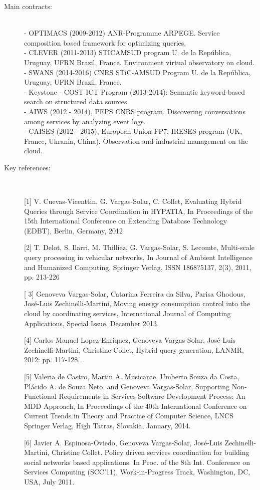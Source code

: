 \begin{description}

\item[Main contracts:] \ \\
- OPTIMACS (2009-2012)	ANR-Programme ARPEGE. Service composition based framework for optimizing queries. \\
- CLEVER (2011-2013) STICAMSUD program  U. de la Rep{\'u}blica, Uruguay, UFRN Brazil, France. Environment virtual observatory on cloud. \\
- SWANS (2014-2016) CNRS STiC-AMSUD Program U. de la Rep{\'u}blica, Uruguay, UFRN Brazil,  France. \\
- Keystone - COST ICT Program (2013-2014): Semantic keyword-based search on structured data sources. \\
- AIWS (2012 - 2014), PEPS  CNRS program. Discovering conversations among services by analyzing event logs.\\
- CAISES (2012 - 2015), European Union FP7, IRESES program (UK, France, Ukrania, China). Observation and industrial management on the cloud.  

\item[Key references:]~%

[1] V. Cuevas-Vicenttin, G.  Vargas-Solar, C. Collet, Evaluating Hybrid Queries through Service Coordination in HYPATIA, In Proceedings of the 15th International Conference on Extending Database Technology (EDBT), Berlin, Germany, 2012

[2] T. Delot, S. Ilarri, M. Thilliez, G.  Vargas-Solar, S. Lecomte, Multi-scale query processing in vehicular networks, In Journal of Ambient Intelligence and Humanized Computing, Springer Verlag, ISSN 1868?5137, 2(3), 2011, pp. 213-226

[ 3]	Genoveva Vargas-Solar, Catarina Ferreira da Silva, Parisa Ghodous, Jos{\'e}-Luis Zechinelli-Martini, Moving energy consumption control into the cloud by coordinating services, International Journal of Computing Applications, Special Issue. December 2013.

[4] Carlos-Manuel Lopez-Enriquez, Genoveva Vargas-Solar, Jos{\'e}-Luis Zechinelli-Martini, Christine Collet, Hybrid query generation,  LANMR, 2012: pp. 117-128, .

[5] Valeria de Castro, Martin A. Musicante, Umberto Souza da Costa, Pl{\'a}cido A. de Souza Neto, and Genoveva Vargas-Solar, Supporting Non-Functional Requirements in Services Software Development Process: An MDD Approach, In Proceedings of the 40th International Conference on Current Trends in Theory and Practice of Computer Science,  LNCS Springer Verlag, High Tatras, Slovakia, January, 2014. 

[6] Javier A. Espinosa-Oviedo, Genoveva Vargas-Solar, Jos{\'e}-Luis Zechinelli-Martini, Christine Collet. Policy driven services coordination for building social networks based applications. In Proc. of the 8th Int. Conference on Services Computing (SCC'11), Work-in-Progress Track, Washington, DC, USA, July 2011.
\end{description}

